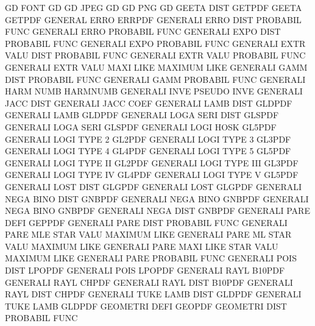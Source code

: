 GD       FONT                           GD
GD       JPEG                           GD
GD       PNG                            GD
GEETA    DIST                           GETPDF
GEETA                                   GETPDF
GENERAL  ERRO                           ERRPDF
GENERALI ERRO DIST                      PROBABIL FUNC
GENERALI ERRO                           PROBABIL FUNC
GENERALI EXPO DIST                      PROBABIL FUNC
GENERALI EXPO                           PROBABIL FUNC
GENERALI EXTR VALU DIST                 PROBABIL FUNC
GENERALI EXTR VALU                      PROBABIL FUNC
GENERALI EXTR VALU MAXI LIKE            MAXIMUM  LIKE
GENERALI GAMM DIST                      PROBABIL FUNC
GENERALI GAMM                           PROBABIL FUNC
GENERALI HARM NUMB                      HARMNUMB
GENERALI INVE                           PSEUDO   INVE
GENERALI JACC DIST                      GENERALI JACC COEF
GENERALI LAMB DIST                      GLDPDF
GENERALI LAMB                           GLDPDF
GENERALI LOGA SERI DIST                 GLSPDF
GENERALI LOGA SERI                      GLSPDF
GENERALI LOGI HOSK                      GL5PDF
GENERALI LOGI TYPE 2                    GL2PDF
GENERALI LOGI TYPE 3                    GL3PDF
GENERALI LOGI TYPE 4                    GL4PDF
GENERALI LOGI TYPE 5                    GL5PDF
GENERALI LOGI TYPE II                   GL2PDF
GENERALI LOGI TYPE III                  GL3PDF
GENERALI LOGI TYPE IV                   GL4PDF
GENERALI LOGI TYPE V                    GL5PDF
GENERALI LOST DIST                      GLGPDF
GENERALI LOST                           GLGPDF
GENERALI NEGA BINO DIST                 GNBPDF
GENERALI NEGA BINO                      GNBPDF
GENERALI NEGA BINO                      GNBPDF
GENERALI NEGA DIST                      GNBPDF
GENERALI PARE DEFI                      GEPPDF
GENERALI PARE DIST                      PROBABIL FUNC
GENERALI PARE MLE  STAR VALU            MAXIMUM  LIKE
GENERALI PARE ML   STAR VALU            MAXIMUM  LIKE
GENERALI PARE MAXI LIKE STAR VALU       MAXIMUM  LIKE
GENERALI PARE                           PROBABIL FUNC
GENERALI POIS DIST                      LPOPDF
GENERALI POIS                           LPOPDF
GENERALI RAYL                           B10PDF
GENERALI RAYL                           CHPDF
GENERALI RAYL DIST                      B10PDF
GENERALI RAYL DIST                      CHPDF
GENERALI TUKE LAMB DIST                 GLDPDF
GENERALI TUKE LAMB                      GLDPDF
GEOMETRI DEFI                           GEOPDF
GEOMETRI DIST                           PROBABIL FUNC
